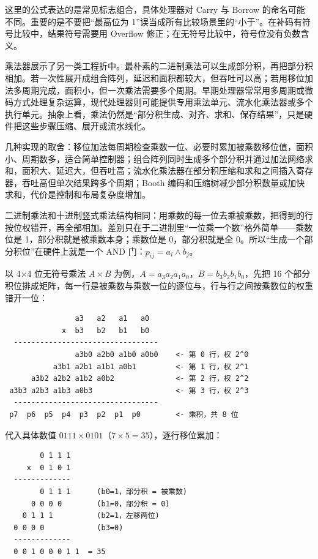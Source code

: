 这里的公式表达的是常见标志组合，具体处理器对 Carry 与 Borrow 的命名可能不同。重要的是不要把“最高位为 1”误当成所有比较场景里的“小于”。在补码有符号比较中，结果符号需要用 Overflow 修正；在无符号比较中，符号位没有负数含义。

乘法器展示了另一类工程折中。最朴素的二进制乘法可以生成部分积，再把部分积相加。若一次性展开成组合阵列，延迟和面积都较大，但吞吐可以高；若用移位加法多周期完成，面积小，但一次乘法需要多个周期。早期处理器常常用多周期或微码方式处理复杂运算，现代处理器则可能提供专用乘法单元、流水化乘法器或多个执行单元。抽象上看，乘法仍然是“部分积生成、对齐、求和、保存结果”，只是硬件把这些步骤压缩、展开或流水线化。

几种实现的取舍：移位加法每周期检查乘数一位、必要时累加被乘数移位值，面积小、周期数多，适合简单控制器；组合阵列同时生成多个部分积并通过加法网络求和，面积大、延迟大，但吞吐高；流水化乘法器在部分积压缩和求和之间插入寄存器，吞吐高但单次结果跨多个周期；Booth 编码和压缩树减少部分积数量或加快求和，代价是控制和布局复杂度增加。


二进制乘法和十进制竖式乘法结构相同：用乘数的每一位去乘被乘数，把得到的行按位权错开，再全部相加。差别只在于二进制里“一位乘一个数”格外简单——乘数位是 1，部分积就是被乘数本身；乘数位是 0，部分积就是全 0。所以“生成一个部分积位”在硬件上就是一个 AND 门：$p_{ij}=a_i \land b_j$。

以 4×4 位无符号乘法 $A\times B$ 为例，$A=a_3a_2a_1a_0$，$B=b_3b_2b_1b_0$，先把 16 个部分积位排成矩阵，每一行是被乘数与乘数一位的逐位与，行与行之间按乘数位的权重错开一位：

\begin{lstlisting}
                a3   a2   a1   a0
             x  b3   b2   b1   b0
  ---------------------------------
                a3b0 a2b0 a1b0 a0b0    <- 第 0 行，权 2^0
           a3b1 a2b1 a1b1 a0b1         <- 第 1 行，权 2^1
      a3b2 a2b2 a1b2 a0b2              <- 第 2 行，权 2^2
 a3b3 a2b3 a1b3 a0b3                   <- 第 3 行，权 2^3
  ---------------------------------
 p7  p6  p5  p4  p3  p2  p1  p0        <- 乘积，共 8 位
\end{lstlisting}

代入具体数值 $0111\times0101$（$7\times5=35$），逐行移位累加：

\begin{lstlisting}
        0 1 1 1
     x  0 1 0 1
  -------------
        0 1 1 1      (b0=1，部分积 = 被乘数)
      0 0 0 0        (b1=0，部分积 = 0)
    0 1 1 1          (b2=1，左移两位)
  0 0 0 0            (b3=0)
  -------------
  0 0 1 0 0 0 1 1  = 35
\end{lstlisting}

